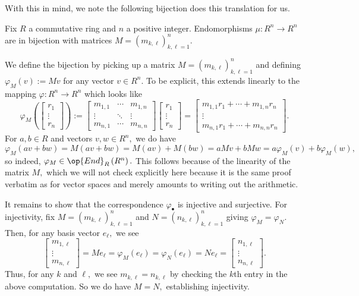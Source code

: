 With this in mind, we note the following bijection does this translation for us.
\begin{lemma}
    Fix $R$ a commutative ring and $n$ a positive integer. Endomorphisms $\mu:R^n\to R^n$ are in bijection with matrices $M=(m_{k,\ell})_{k,\ell=1}^n.$
\end{lemma}
We define the bijection by picking up a matrix $M=(m_{k,\ell})_{k,\ell=1}^n$ and defining $\varphi_M(v):=Mv$ for any vector $v\in R^n.$ To be explicit, this extends linearly to the mapping $\varphi:R^n\to R^n$ which looks like
\[\varphi_M\left(\begin{bmatrix}r_1 \\ \vdots \\ r_n\end{bmatrix}\right):=
\begin{bmatrix}
    m_{1,1} & \cdots & m_{1,n} \\
    \vdots & \ddots & \vdots \\
    m_{n,1} & \cdots & m_{n,n}
\end{bmatrix}\begin{bmatrix}r_1 \\ \vdots \\ r_n\end{bmatrix}=
\begin{bmatrix}
    m_{1,1}r_1 + \cdots + m_{1,n}r_n \\
    \vdots \\
    m_{n,1}r_1 + \cdots + m_{n,n}r_n
\end{bmatrix}.\]
For $a,b\in R$ and vectors $v,w\in R^n,$ we do have
\[\varphi_M(av+bw)=M(av+bw)=M(av)+M(bw)=aMv+bMw=a\varphi_M(v)+b\varphi_M(w),\]
so indeed, $\varphi_M\in\op{End}_R\left(R^n\right).$ This follows because of the linearity of the matrix $M,$ which we will not check explicitly here because it is the same proof verbatim as for vector spaces and merely amounts to writing out the arithmetic.

It remains to show that the correspondence $\varphi_\bullet$ is injective and surjective. For injectivity, fix $M=(m_{k,\ell})_{k,\ell=1}^n$ and $N=(n_{k,\ell})_{k,\ell=1}^n$ giving $\varphi_M=\varphi_N.$ Then, for any basis vector $e_\ell,$ we see
\[\begin{bmatrix}m_{1,\ell} \\ \vdots \\ m_{n,\ell}\end{bmatrix}=Me_\ell=\varphi_M(e_\ell)=\varphi_N(e_\ell)=Ne_\ell=\begin{bmatrix}n_{1,\ell} \\ \vdots \\ n_{n,\ell}\end{bmatrix}.\]
Thus, for any $k$ and $\ell,$ we see $m_{k,\ell}=n_{k,\ell}$ by checking the $k$th entry in the above computation. So we do have $M=N,$ establishing injectivity.

